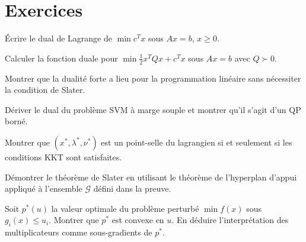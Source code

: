 \section{Exercices}

\begin{exercice}[$\star$]
\'Ecrire le dual de Lagrange de $\min c^Tx$ sous $Ax = b$, $x \geq 0$.
\end{exercice}

\begin{exercice}[$\star$]
Calculer la fonction duale pour $\min \frac{1}{2}x^TQx + c^Tx$ sous $Ax = b$
avec $Q \succ 0$.
\end{exercice}

\begin{exercice}[$\star\star$]
Montrer que la dualit\'e forte a lieu pour la programmation lin\'eaire sans
n\'ecessiter la condition de Slater.
\end{exercice}

\begin{exercice}[$\star\star$]
D\'eriver le dual du probl\`eme SVM \`a marge souple et montrer qu'il s'agit d'un
QP born\'e.
\end{exercice}

\begin{exercice}[$\star\star$]
Montrer que $(x^*, \lambda^*, \nu^*)$ est un point-selle du lagrangien si et seulement
si les conditions KKT sont satisfaites.
\end{exercice}

\begin{exercice}[$\star\star\star$]
D\'emontrer le th\'eor\`eme de Slater en utilisant le th\'eor\`eme de l'hyperplan
d'appui appliqu\'e \`a l'ensemble $\mathcal{G}$ d\'efini dans la preuve.
\end{exercice}

\begin{exercice}[$\star\star\star$]
Soit $p^*(u)$ la valeur optimale du probl\`eme perturb\'e
$\min f(x)$ sous $g_i(x) \leq u_i$. Montrer que $p^*$ est convexe en $u$.
En d\'eduire l'interpr\'etation des multiplicateurs comme sous-gradients de $p^*$.
\end{exercice}
